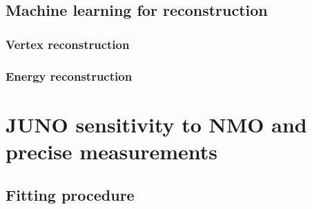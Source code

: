 \subsection{Machine learning for reconstruction}

\subsubsection{Vertex reconstruction}

\subsubsection{Energy reconstruction}

\section{JUNO sensitivity to NMO and precise measurements}

\subsection{Fitting procedure}
